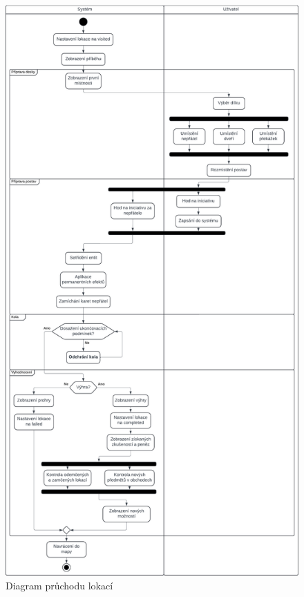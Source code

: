 \newpage
\begin{figure}[H]
    \centering
    \includegraphics[height=0.98\textheight]{figures/diagrams/encounter.pdf}
    \caption{Diagram průchodu lokací}
    \label{diag:encounter}
\end{figure}
\newpage

